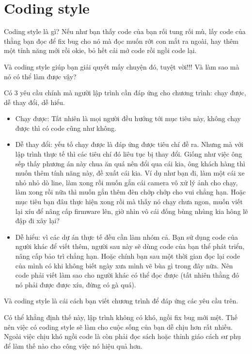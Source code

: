 \chapter{Coding style}
\newpage

Coding style là gì? Nếu như bạn thấy code của bạn rối tung rối mù, lấy code của thằng bạn đọc để fix bug cho nó mà đọc muốn rớt con mắt ra ngoài, hay thêm một tính năng mới rồi okie, bỏ hết cái mớ code rồi ngồi code lại.

Và coding style giúp bạn giải quyết mấy chuyện đó, tuyệt vời!!! Và làm sao mà nó có thể làm được vậy?

Có 3 yêu cầu chính mà người lập trình cần đáp ứng cho chương trình: chạy được, dễ thay đổi, dễ hiểu.
\begin{itemize}
  \item Chạy được: Tất nhiên là mọi người đều hướng tới mục tiêu này, không chạy được thì có code cũng như không.
  \item Dễ thay đổi: yếu tố chạy được là đáp ứng được tiêu chí đề ra. Nhưng mà với lập trình thực tế thì các tiêu chí đó liêu tục bị thay đổi. Giống như việc ông sếp thấy phương án này chua ăn quá nên đổi qua cái kia, ông khách hàng thì muốn thêm tính năng này, đề xuất cái kia. Ví dụ như bạn đi, làm một cái xe nhỏ nhỏ dò line, làm xong rồi muốn gắn cái camera vô xử lý ảnh cho chạy, làm xong rồi nữa thì muốn gắn thêm đèn chớp chớp cho vui chẳng hạn. Hoặc mục tiêu bạn đâu thực hiện xong rồi mà thấy nó chạy chưa ngon, muốn viết lại xíu để nâng cấp firmware lên, giờ nhìn vô cái đống bùng nhùng kia hông lẽ đập đi xây lại?
	\item Dễ hiểu: vì các dự án thực tế đều cần làm nhóm cả. Bạn sử dụng code của người khác để viết thêm, người sau này sẽ dùng code của bạn thể phát triển, nâng cấp bảo trì chẳng hạn. Hoặc chính bạn sau một thời gian đọc lại code của mình có khi không biết ngày xưa mình vẽ bùa gì trong đây nữa. Nên code phải viết làm sao cho người khác có thể đọc được (tất nhiên thằng đó nó phải được được xíu, đừng có gà quá).
\end{itemize}

Và coding style là cái cách bạn viết chương trình để đáp ứng các yêu cầu trên.

Có thể khẳng định thế này, lập trình không có khó, ngồi fix bug mới mệt. Thế nên việc có coding style sẽ làm cho cuộc sống của bạn dễ chịu hơn rất nhiều. Ngoài việc chịu khó ngồi code là còn phải đọc sách hoặc thỉnh giáo cách sư phụ để làm thế nào cho công việc nó hiệu quả hơn.

